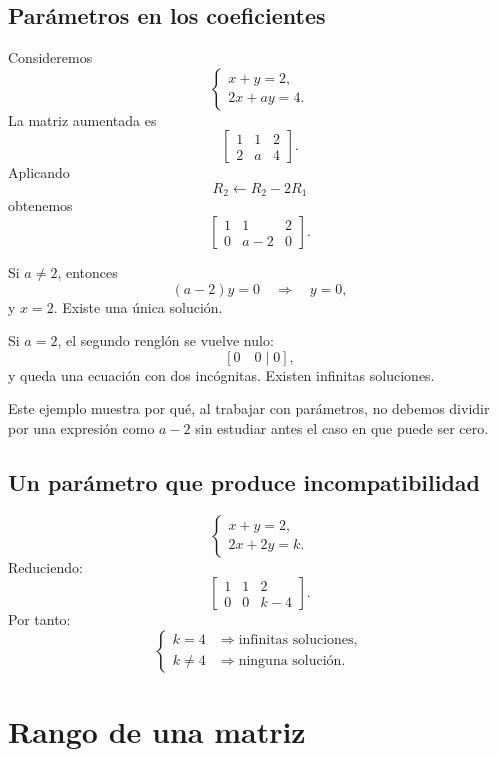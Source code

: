 \documentclass[12pt]{article}
\theoremstyle{remark}
\begin{document}
\subsection{Parámetros en los coeficientes}

Consideremos
\[
\begin{cases}
x+y=2,\\
2x+ay=4.
\end{cases}
\]
La matriz aumentada es
\[
\left[
\begin{array}{cc|c}
1&1&2\\
2&a&4
\end{array}
\right].
\]
Aplicando
\[
R_2\leftarrow R_2-2R_1
\]
obtenemos
\[
\left[
\begin{array}{cc|c}
1&1&2\\
0&a-2&0
\end{array}
\right].
\]

Si $a\neq2$, entonces
\[
(a-2)y=0\quad\Longrightarrow\quad y=0,
\]
y $x=2$. Existe una única solución.

Si $a=2$, el segundo renglón se vuelve nulo:
\[
[0\quad0\mid0],
\]
y queda una ecuación con dos incógnitas. Existen infinitas soluciones.

Este ejemplo muestra por qué, al trabajar con parámetros, no debemos dividir por una expresión como
$a-2$ sin estudiar antes el caso en que puede ser cero.

\subsection{Un parámetro que produce incompatibilidad}

\[
\begin{cases}
x+y=2,\\
2x+2y=k.
\end{cases}
\]
Reduciendo:
\[
\left[
\begin{array}{cc|c}
1&1&2\\
0&0&k-4
\end{array}
\right].
\]
Por tanto:
\[
\begin{cases}
k=4 &\Longrightarrow \text{infinitas soluciones},\\
k\neq4 &\Longrightarrow \text{ninguna solución}.
\end{cases}
\]

\section{Rango de una matriz}
\end{document}
